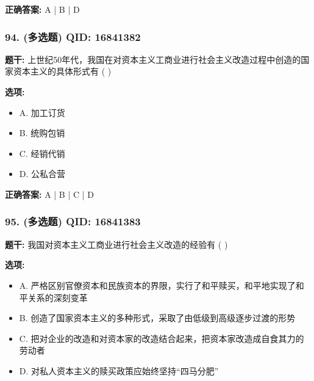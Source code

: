 \documentclass[12pt,UTF8]{ctexart}
\begin{document}
\textbf{正确答案:}
A | B | D

\vspace{0.3em}\hrulefill\vspace{0.7em}

\subsubsection*{94. (多选题) \small QID: 16841382}

\textbf{题干:}
上世纪50年代，我国在对资本主义工商业进行社会主义改造过程中创造的国家资本主义的具体形式有 ( )

\textbf{选项:}
\begin{itemize}[leftmargin=*]

  \item A. 加工订货

  \item B. 统购包销

  \item C. 经销代销

  \item D. 公私合营

\end{itemize}

\textbf{正确答案:}
A | B | C | D

\vspace{0.3em}\hrulefill\vspace{0.7em}

\subsubsection*{95. (多选题) \small QID: 16841383}

\textbf{题干:}
我国对资本主义工商业进行社会主义改造的经验有 ( )

\textbf{选项:}
\begin{itemize}[leftmargin=*]

  \item A. 严格区别官僚资本和民族资本的界限，实行了和平赎买，和平地实现了和平关系的深刻变革

  \item B. 创造了国家资本主义的多种形式，采取了由低级到高级逐步过渡的形势

  \item C. 把对企业的改造和对资本家的改造结合起来，把资本家改造成自食其力的劳动者

  \item D. 对私人资本主义的赎买政策应始终坚持“四马分肥”

\end{itemize}
\end{document}

